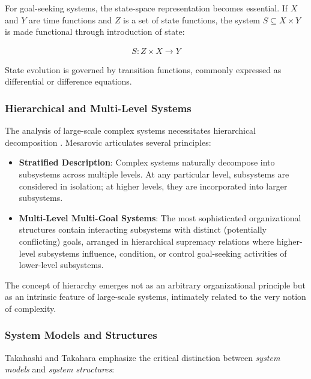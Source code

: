 For goal-seeking systems, the state-space representation becomes essential. If $X$ and $Y$ are time functions and $Z$ is a set of state functions, the system $S \subseteq X \times Y$ is made functional through introduction of state:

\begin{align*}
S: Z \times X \to Y
\end{align*}

State evolution is governed by transition functions, commonly expressed as differential or difference equations.

\subsubsection{Hierarchical and Multi-Level Systems}

The analysis of large-scale complex systems necessitates hierarchical decomposition \citep{mesarovic1972conceptual}. Mesarovic articulates several principles:

\begin{itemize}
\item \textbf{Stratified Description}: Complex systems naturally decompose into subsystems across multiple levels. At any particular level, subsystems are considered in isolation; at higher levels, they are incorporated into larger subsystems.

\item \textbf{Multi-Level Multi-Goal Systems}: The most sophisticated organizational structures contain interacting subsystems with distinct (potentially conflicting) goals, arranged in hierarchical supremacy relations where higher-level subsystems influence, condition, or control goal-seeking activities of lower-level subsystems.
\end{itemize}

The concept of hierarchy emerges not as an arbitrary organizational principle but as an intrinsic feature of large-scale systems, intimately related to the very notion of complexity.

\subsubsection{System Models and Structures}

Takahashi and Takahara \citep{takahashi1995logical} emphasize the critical distinction between \emph{system models} and \emph{system structures}:

